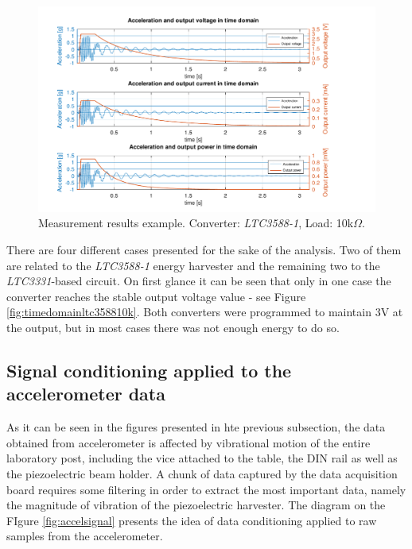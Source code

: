 \documentclass[12pt,a4paper]{article}
\begin{document}
\begin{landscape} 
\begin{figure}[ht!]
\includegraphics[scale=1.05]{timedomainltc333110k.pdf}
\caption{Measurement results example. Converter: \textit{LTC3588-1}, Load: 10k$\Omega$.}
\label{fig:timedomainltc333110k}
\end{figure}
\end{landscape}

There are four different cases presented for the sake of the analysis. Two of them are related to the \textit{LTC3588-1} energy harvester and the remaining two to the \textit{LTC3331}-based circuit. On first glance it can be seen that only in one case the converter reaches the stable output voltage value - see Figure \ref{fig:timedomainltc358810k}. Both converters were programmed to maintain 3V at the output, but in most cases there was not enough energy to do so.



\subsection{Signal conditioning applied to the accelerometer data}

As it can be seen in the figures presented in hte previous subsection, the data obtained from accelerometer is affected by vibrational motion of the entire laboratory post, including the vice attached to the table, the DIN rail as well as the piezoelectric beam holder. A chunk of data captured by the data acquisition board requires some filtering in order to extract the most important data, namely the magnitude of vibration of the piezoelectric harvester. The diagram on the FIgure \ref{fig:accelsignal} presents the idea of data conditioning applied to raw samples from the accelerometer.
\end{document}
